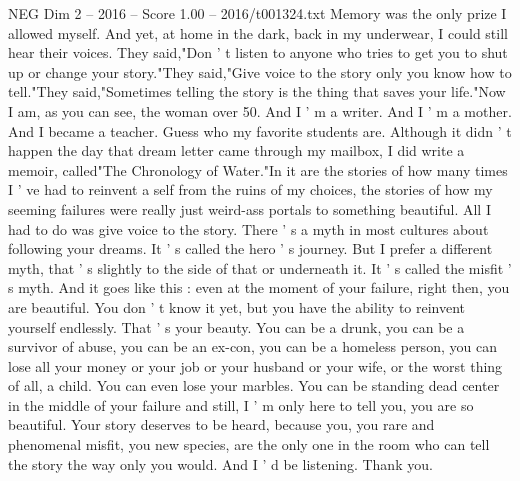 \begin{textsample}{NEG Dim 2 – 2016 – Score 1.00 – 2016/t001324.txt}
Memory was the only prize I allowed myself.
And yet, at home in the dark, back in my underwear, I could still hear their voices.
They said,"Don ' t listen to anyone who tries to get you to shut up or change your story."They said,"Give voice to the story only you know how to tell."They said,"Sometimes telling the story is the thing that saves your life."Now I am, as you can see, the woman over 50.
And I ' m a writer.
And I ' m a mother.
And I became a teacher.
Guess who my favorite students are.
Although it didn ' t happen the day that dream letter came through my mailbox, I did write a memoir, called"The Chronology of Water."In it are the stories of how many times I ' ve had to reinvent a self from the ruins of my choices, the stories of how my seeming failures were really just weird-ass portals to something beautiful.
All I had to do was give voice to the story.
There ' s a myth in most cultures about following your dreams.
It ' s called the hero ' s journey.
But I prefer a different myth, that ' s slightly to the side of that or underneath it.
It ' s called the misfit ' s myth.
And it goes like this : even at the moment of your failure, right then, you are beautiful.
You don ' t know it yet, but you have the ability to reinvent yourself endlessly.
That ' s your beauty.
You can be a drunk, you can be a survivor of abuse, you can be an ex-con, you can be a homeless person, you can lose all your money or your job or your husband or your wife, or the worst thing of all, a child.
You can even lose your marbles.
You can be standing dead center in the middle of your failure and still, I ' m only here to tell you, you are so beautiful.
Your story deserves to be heard, because you, you rare and phenomenal misfit, you new species, are the only one in the room who can tell the story the way only you would.
And I ' d be listening.
Thank you.

\end{textsample}
